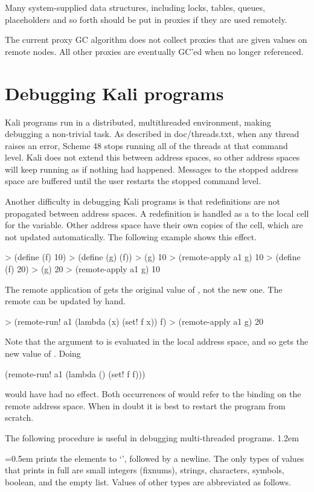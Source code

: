 \documentclass{article}
\newenvironment{protos}{\list{$\bullet$}
{\leftmargin1.2em\rightmargin0pt\itemsep0pt\parsep0pt\partopsep-2pt}}
{\endlist}
\newcommand{\protonoresult}[2]{\item\noindent\unskip%
\hbox{\spaceskip=0.5em\code{(\hbox{#1}{\it#2\/})}}}
\newenvironment{protos}{\begin{itemize}}{\end{itemize}}
\newcommand{\protonoresult}[2]{%
\cindex{\code{#1}}%
\item\noindent\code{({#1}{\var{#2}\/})}}
\begin{document}
Many system-supplied data structures, including locks, tables, queues,
 placeholders and so forth should be put in proxies if they are used remotely.

The current proxy GC algorithm does not collect proxies that are given values
 on remote nodes.
All other proxies are eventually GC'ed when no longer referenced.

\section{Debugging Kali programs}

Kali programs run in a distributed, multithreaded environment, making debugging
 a non-trivial task.
As described in doc/threads.txt, when any thread raises an
 error, Scheme 48 stops running all of the threads at that command level.
Kali does not extend this between address spaces, so other address spaces will
 keep running as if nothing had happened.
Messages to the stopped address space are buffered until the user restarts
 the stopped command level.

Another difficulty in debugging Kali programs is that redefinitions are not
 propagated between address spaces.
A redefinition is handled as a  to the local cell for the variable.
Other address space have their own copies of the cell, which are not updated
automatically.  The following example shows this effect.
\begin{example}
> (define (f) 10)
> (define (g) (f))
> (g)
10
> (remote-apply a1 g)
10
> (define (f) 20)
> (g)
20
> (remote-apply a1 g)
10
\end{example}
The remote application of  gets the original value of ,
 not the new one.
The remote  can be updated by hand.
\begin{example}
> (remote-run! a1 (lambda (x) (set! f x)) f)
> (remote-apply a1 g)
20
\end{example}
Note that the argument to  is evaluated in the local address
 space, and so gets the new value of .
Doing
\begin{example}
(remote-run! a1 (lambda () (set! f f)))
\end{example}
would have had no effect.
Both occurrences of  would refer to the binding on the remote
 address space.
When in doubt it is best to restart the program from scratch.

The following procedure is useful in debugging multi-threaded programs.
\begin{protos}
\protonoresult{debug-message}{ element$_0$ \ldots}
\end{protos}
 prints the elements to `', followed by a
 newline.
The only types of values that  prints in full are small
 integers (fixnums), strings, characters, symbols, boolean, and the empty list.
Values of other types are abbreviated as follows.
\end{document}

